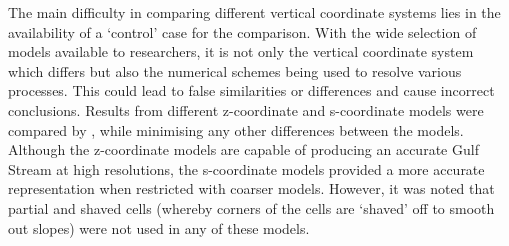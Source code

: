 \documentclass[..\report.tex]{subfiles}
\begin{document}
The main difficulty in comparing different vertical coordinate systems lies in the availability of a `control' case for the comparison. With the wide selection of models available to researchers, it is not only the vertical coordinate system which differs but also the numerical schemes being used to resolve various processes. This could lead to false similarities or differences and cause incorrect conclusions.
Results from different z-coordinate and s-coordinate models were compared by \citet{Ezer2016b}, while minimising any other differences between the models. Although the z-coordinate models are capable of producing an accurate Gulf Stream at high resolutions, the s-coordinate models provided a more accurate representation when restricted with coarser models. However, it was noted that partial and shaved cells (whereby corners of the cells are `shaved' off to smooth out slopes) were not used in any of these models.
\end{document}

